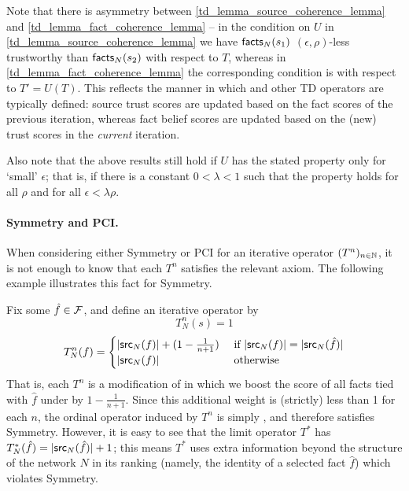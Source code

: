 Note that there is asymmetry between \cref{td_lemma_source_coherence_lemma}
and \cref{td_lemma_fact_coherence_lemma} -- in the condition on $U$ in
\cref{td_lemma_source_coherence_lemma} we have $\mathsf{facts}_N(s_1)$ $(\epsilon,
\rho)$-less trustworthy than $\mathsf{facts}_N(s_2)$ with respect to $T$, whereas in
\cref{td_lemma_fact_coherence_lemma} the corresponding condition is with
respect to $T' = U(T)$. This reflects the manner in which \sums{} and other TD
operators are typically defined: source trust scores are updated based on the
fact scores of the previous iteration, whereas fact belief scores are updated
based on the (new) trust scores in the \emph{current} iteration.

Also note that the above results still hold if $U$ has the stated property only
for `small' $\epsilon$; that is, if there is a constant $0 < \lambda < 1$ such
that the property holds for all $\rho$ and for all $\epsilon < \lambda\rho$.

\paragraph{Symmetry and PCI.} When considering either Symmetry or PCI
for an iterative operator $(T^n)_{n \in \mathbb{N}}$, it is not enough to know that
each $T^n$ satisfies the relevant axiom. The following example illustrates this
fact for Symmetry.

\begin{example}
Fix some $\hat{f} \in \mathcal{F}$, and define an iterative operator by
\[
    T_N^n(s) = 1
\]
\[
    T_N^n(f) = \begin{cases}
        |\mathsf{src}_N(f)| + (1 - \frac{1}{n + 1}) & \text{ if } |\mathsf{src}_N(f)| = |\mathsf{src}_N(\hat{f})| \\
        |\mathsf{src}_N(f)| & \text{ otherwise }
    \end{cases}
\]
That is, each $T^n$ is a modification of \voting{} in which we boost the score
of all facts tied with $\hat{f}$ under \voting{} by $1 - \frac{1}{n+1}$.
Since this additional weight is (strictly) less than 1 for each $n$, the
ordinal operator induced by $T^n$ is simply \voting{}, and therefore satisfies
Symmetry. However, it is easy to see that the limit operator $T^*$ has
$T_N^*(\hat{f}) = |\mathsf{src}_N(\hat{f})| + 1$; this means $T^*$ uses extra
information beyond the structure of the network $N$ in its ranking (namely, the
identity of a selected fact $\hat{f}$) which violates Symmetry.

\end{example}

